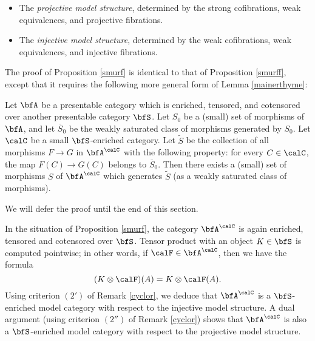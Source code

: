 \begin{Simplicial Categories}
\begin{proposition}
\begin{itemize}
\item The {\it projective model structure}, determined by the strong
cofibrations, weak equivalences, and projective fibrations.

\item The {\it injective model structure}, determined by the weak
cofibrations, weak equivalences, and injective fibrations.
\end{itemize}
\end{proposition}

The proof of Proposition \ref{smurf} is identical to that of Proposition \ref{smurff}, 
except that it requires the following more general form of Lemma \ref{mainerthyme}:

\begin{lemma}\label{mainertime}
Let $\bfA$ be a presentable category which is enriched, tensored, and cotensored over another presentable category $\bfS$. Let $S_0$ be a (small) set of morphisms of $\bfA$, and let $\overline{S}_0$ be the weakly saturated class of morphisms generated by $S_0$. Let $\calC$ be a small $\bfS$-enriched category. Let $\widetilde{S}$ be the collection of all morphisms $F \rightarrow G$ in $\bfA^{\calC}$ with the following property: for every $C \in \calC$, the map $F(C) \rightarrow G(C)$ belongs to $\overline{S}_0$. Then there exists a (small) set of morphisms $S$ of $\bfA^{\calC}$ which generates $\widetilde{S}$ (as a weakly saturated class of morphisms).
\end{lemma}

We will defer the proof until the end of this section.

\begin{remark}\label{suboteki}
In the situation of Proposition \ref{smurf}, the category $\bfA^{\calC}$ is again
enriched, tensored and cotensored over $\bfS$. Tensor product with an object $K \in \bfS$ is computed pointwise; in other words, if $\calF \in \bfA^{\calC}$, then we have the formula $$ (K \otimes \calF)(A) = K \otimes \calF(A).$$
Using criterion $(2')$ of Remark \ref{cyclor}, we deduce that $\bfA^{\calC}$ is a $\bfS$-enriched model category with respect to the injective model structure. A dual argument (using criterion $(2'')$ of Remark \ref{cyclor}) shows that $\bfA^{\calC}$ is also a $\bfS$-enriched model category with respect to the projective model structure.
\end{remark}


\end{Simplicial Categories}
